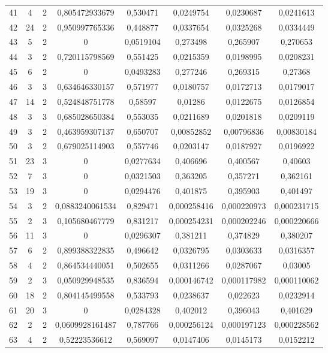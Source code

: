 \begin{longtable}{|c|c|c|c|c|c|c|c|}
41 & 4 & 2 & 0,805472933679 & 0,530471 & 0,0249754 & 0,0230687 & 0,0241613 \\
42 & 24 & 2 & 0,950997765336 & 0,448877 & 0,0337654 & 0,0325268 & 0,0334449 \\
43 & 5 & 2 & 0 & 0,0519104 & 0,273498 & 0,265907 & 0,270653 \\
44 & 3 & 2 & 0,720115798569 & 0,551425 & 0,0215359 & 0,0198995 & 0,0208231 \\
45 & 6 & 2 & 0 & 0,0493283 & 0,277246 & 0,269315 & 0,27368 \\
46 & 3 & 3 & 0,634646330157 & 0,571977 & 0,0180757 & 0,0172713 & 0,0179017 \\
47 & 14 & 2 & 0,524848751778 & 0,58597 & 0,01286 & 0,0122675 & 0,0126854 \\
48 & 3 & 3 & 0,685028650384 & 0,553035 & 0,0211689 & 0,0201818 & 0,0209119 \\
49 & 3 & 2 & 0,463959307137 & 0,650707 & 0,00852852 & 0,00796836 & 0,00830184 \\
50 & 3 & 2 & 0,679025114903 & 0,557746 & 0,0203147 & 0,0187927 & 0,0196922 \\
51 & 23 & 3 & 0 & 0,0277634 & 0,406696 & 0,400567 & 0,40603 \\
52 & 7 & 3 & 0 & 0,0321503 & 0,363205 & 0,357271 & 0,362161 \\
53 & 19 & 3 & 0 & 0,0294476 & 0,401875 & 0,395903 & 0,401497 \\
54 & 3 & 2 & 0,0883240061534 & 0,829471 & 0,000258416 & 0,000220973 & 0,000231715 \\
55 & 2 & 3 & 0,105680467779 & 0,831217 & 0,000254231 & 0,000202246 & 0,000220666 \\
56 & 11 & 3 & 0 & 0,0296307 & 0,381211 & 0,374829 & 0,380207 \\
57 & 6 & 2 & 0,899388322835 & 0,496642 & 0,0326795 & 0,0303633 & 0,0316357 \\
58 & 4 & 2 & 0,864534440051 & 0,502655 & 0,0311266 & 0,0287067 & 0,03005 \\
59 & 2 & 3 & 0,050929948535 & 0,836594 & 0,000146742 & 0,000117982 & 0,000110062 \\
60 & 18 & 2 & 0,804145499558 & 0,533793 & 0,0238637 & 0,022623 & 0,0232914 \\
61 & 20 & 3 & 0 & 0,0284328 & 0,402012 & 0,396043 & 0,401629 \\
62 & 2 & 2 & 0,0609928161487 & 0,787766 & 0,000256124 & 0,000197123 & 0,000228562 \\
63 & 4 & 2 & 0,52223536612 & 0,569097 & 0,0147406 & 0,0145173 & 0,0152212 \\

\end{longtable}
